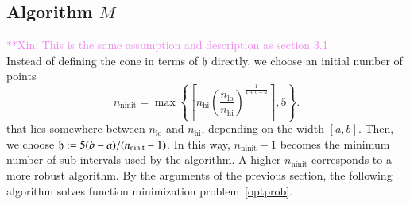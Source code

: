 \documentclass[review]{elsarticle}
\theoremstyle{definition}
\newcommand{\xinnote}[1]{ {\textcolor{violet}  {\mbox{**Xin:} #1}}}
\DeclareMathOperator{\lo}{lo}
\DeclareMathOperator{\ninit}{ninit}
\begin{document}
\subsection{Algorithm $M$}  \label{sec:minalgo}
\xinnote{This is the same assumption and description as section 3.1}\\
Instead of defining the cone in terms of $\mathfrak{h}$ directly, we choose an initial number of points
\begin{equation*}
	n_{\ninit} = \max\left\{\left\lceil n_{\text{hi}}
	\left(\frac{n_{\lo}}{n_{\text{hi}}}\right)^{\frac{1}{1+b-a}}\right\rceil ,5\right\}.
\end{equation*}
that lies somewhere between $n_{\lo}$ and $n_{\text{hi}}$, depending on the width $[a,b]$.  Then, we choose $\fh := 5(b-a)/(n_{\ninit}-1)$.  In this way, $n_{\ninit} -1$ becomes the minimum number of sub-intervals used by the algorithm.  A higher $n_{\ninit}$ corresponds to a more robust algorithm.  By the arguments of the previous section, the following algorithm solves function minimization problem~\eqref{optprob}.
\end{document}
